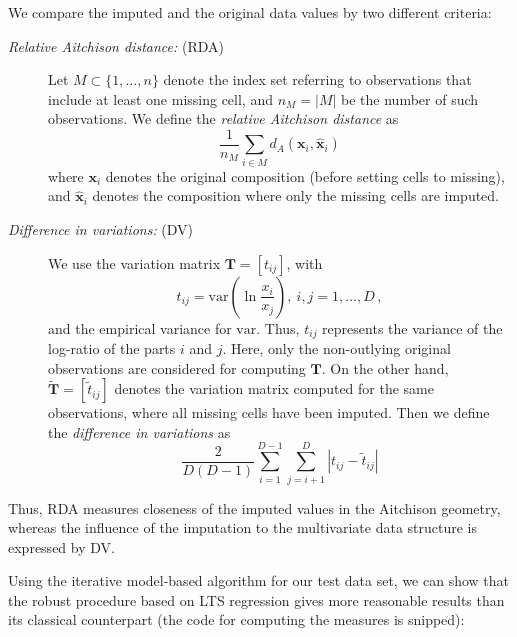 \documentclass{scrartcl}\usepackage[]{graphicx}\usepackage[]{color}
\newcommand{\m}[1]{\ensuremath{\mathbf{#1}}}
\begin{document}
We compare the imputed and the original data values by two different
criteria:
\begin{description}
\item[\textit{Relative Aitchison distance:} (RDA)]
Let $M\subset \{1,\ldots ,n\}$ denote the index set referring to observations
that include at least one missing cell, and $n_M=|M|$ be the number of such observations.
We define the \textit{relative Aitchison distance} as
\begin{equation}
\label{relAitchison}
\frac{1}{n_M}\sum\limits_{i \in M} d_A(\m{x}_{i},\hat{\m{x}}_{i})
\end{equation}
where $\m{x}_{i}$ denotes the original composition (before setting cells to
missing), and $\hat{\m{x}}_{i}$ denotes the composition where only the missing
cells are imputed. 

\item[\textit{Difference in variations:} (DV)]
We use the variation matrix $\m{T}=[t_{ij}]$, with
\begin{displaymath}
\label{variation}
t_{ij}=\mathrm{var}\left(\ln\frac{x_i}{x_j}\right),\ i,j=1,\dots,D\,,
\end{displaymath}
and the empirical variance for $\mathrm{var}$.
Thus, $t_{ij}$ represents the variance of the log-ratio of the parts 
$i$ and $j$. Here, only the non-outlying original observations
are considered for computing $\m{T}$. 
On the other hand, 
$\tilde{\m{T}}=[\tilde{t}_{ij}]$
denotes the variation matrix computed for the same observations,
where all missing cells have been imputed.
Then we define the \textit{difference in variations} as
\begin{equation}
\label{diffvariation}
\frac{2}{D(D-1)}
\sum\limits_{i=1}^{D-1}
\sum\limits_{j=i+1}^{D}
|t_{ij} - \tilde{t}_{ij}|
\end{equation}
\end{description}
Thus, RDA measures closeness of the imputed
values in the Aitchison geometry, whereas the influence of the imputation
to the multivariate data structure is expressed by DV.

Using the iterative model-based algorithm for our test data set,
we can show that the robust procedure based on LTS regression
gives more reasonable results than its classical counterpart
(the code for computing the measures is snipped):

\end{document}
